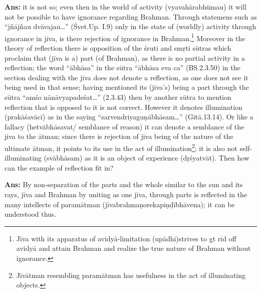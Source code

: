 \textbf{Ans:} it is not so; even then in the world of activity (vyavahārabhūmau) it will not be possible to have ignorance regarding Brahman.  Through statemens such as “jñājñau dvāvajau…” (Śvet.Up. I.9) only in the state of (worldly) activity through ignorance in jīva, is there rejection of ignorance in Brahman.\footnote{Jīva with its apparatus of avidyā-limitation (upādhi)strives to gt rid off avidyā and attain Brahman and realize the true nature of Brahman without ignorance.} Moreover in the theory of reflection there is opposition of the śruti and smṛti sūtras which proclaim that (jīva is a) part (of Brahman), as there is no partial activity in a reflection;  the word “ābhāsa” in the sūtra “ābhāsa eva ca” (BS.2.3.50) in the section dealing with the jīva does not denote a reflection, as one does not see it being used in that sense; having mentioned its (jīva’s) being a part through the sūtra “amśo nānāvyapadeśat…” (2.3.43) then by another sūtra to mention reflection that is opposed to it is not correct. However it denotes illumination (prakāśavācī) as in the saying “sarvendriyaguṇābhāsam…” (Gītā.13.14). Or like a fallacy (hetvābhāsavat/ semblance of reason) it can denote a semblance of the jiva to the ātman;  since there is rejection of jīva being of the nature of the ultimate ātman, it points to its use in the act of illumination\footnote{Jīvātman resembling paramātman has usefulness in the act of illuminating objects.}; it is also not self-illuminating (svābhāsam) as it is an object of experience (dṛśyatvāt).   Then how can the example of reflection fit in? 

\textbf{Ans:} By non-separation of the parts and the whole similar to the sun and its rays, jīva and Brahman by uniting as one jīva, through parts is reflected in the many intellects of paramātman (jīvabrahmaṇorekapiṇḍībhāvena); it can be understood thus.


